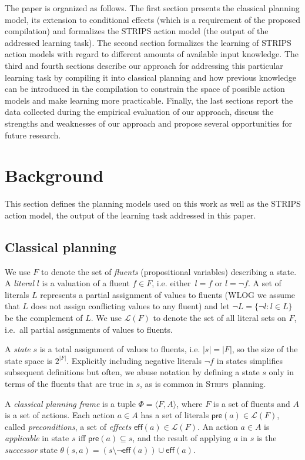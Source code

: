 \documentclass[letterpaper]{article} %
\newcommand{\tup}[1]{{\langle #1 \rangle}}
\newcommand{\pre}{\mathsf{pre}}     %
\newcommand{\eff}{\mathsf{eff}}     %
\newcommand{\strips}{\textsc{Strips}}     %
\begin{document}
The paper is organized as follows. The first section presents the classical planning model, its extension to conditional effects (which is a requirement of the proposed compilation) and formalizes the STRIPS action model (the output of the addressed learning task). The second section formalizes the learning of STRIPS action models with regard to different amounts of available input knowledge. The third and fourth sections describe our approach for addressing this particular learning task by compiling it into classical planning and how previous knowledge can be introduced in the compilation to constrain the space of possible action models and make learning more practicable. Finally, the last sections report the data collected during the empirical evaluation of our approach, discuss the strengths and weaknesses of our approach and propose several opportunities for future research.


\section{Background}
This section defines the planning models used on this work as well as the STRIPS action model, the output of the learning task addressed in this paper.

\subsection{Classical planning}
We use $F$ to denote the set of {\em fluents} (propositional variables) describing a state. A {\em literal} $l$ is a valuation of a fluent $f\in F$, i.e. either~$l=f$ or $l=\neg f$. A set of literals $L$ represents a partial assignment of values to fluents (WLOG we assume that $L$ does not assign conflicting values to any fluent) and let $\neg L=\{\neg l:l\in L\}$ be the complement of $L$. We use $\mathcal{L}(F)$ to denote the set of all literal sets on $F$, i.e.~all partial assignments of values to fluents.

A {\em state} $s$ is a total assignment of values to fluents, i.e. $|s|=|F|$, so the size of the state space is $2^{|F|}$. Explicitly including negative literals $\neg f$ in states simplifies subsequent definitions but often, we abuse notation by defining a state $s$ only in terms of the fluents that are true in $s$, as is common in \strips\ planning.

A {\em classical planning frame} is a tuple $\Phi=\tup{F,A}$, where $F$ is a set of fluents and $A$ is a set of actions. Each action $a\in A$ has a set of literals $\pre(a)\in\mathcal{L}(F)$, called {\em preconditions}, a set of {\em effects} $\eff(a)\in\mathcal{L}(F)$. An action $a\in A$ is {\em applicable} in state $s$ iff $\pre(a)\subseteq s$, and the result of applying $a$ in $s$ is the {\em successor} state $\theta(s,a)=(s\setminus \neg\eff(a))\cup\eff(a)$.
\end{document}
